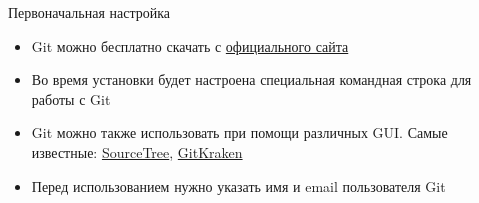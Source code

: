 \begin{frame}{Первоначальная настройка}
    \begin{itemize}
        \item 
            Git можно бесплатно скачать с \href{https://www.git-scm.com/downloads}{официального сайта}
        \item 
            Во время установки будет настроена специальная командная строка для работы с Git
        \item
            Git можно также использовать при помощи различных GUI. Самые известные: \href{https://www.sourcetreeapp.com/}{SourceTree}, \href{https://www.gitkraken.com/}{GitKraken}
        \item
            Перед использованием нужно указать имя и email пользователя Git
    \end{itemize}
\end{frame}